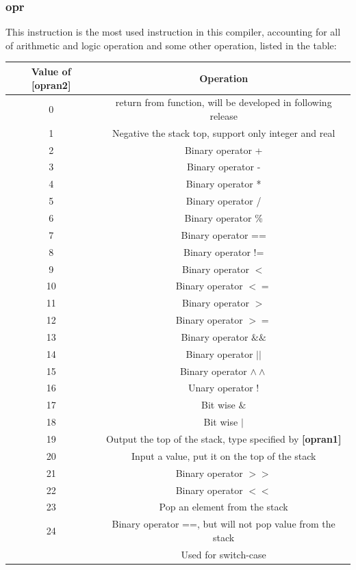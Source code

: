 \documentclass{article}
\begin{document}
		\subsubsection{opr}
		This instruction is the most used instruction in this compiler, accounting for all of arithmetic and logic operation and some other operation, listed in the table:\\
		\begin{center}
			\begin{tabular}{cc}
			\toprule
			Value of \textbf{[opran2]} & Operation \\
			\midrule
			0 & return from function, will be developed in following release\\
			1 & Negative the stack top, support only integer and real\\
			2 & Binary operator + \\
			3 & Binary operator - \\
			4 & Binary operator * \\
			5 & Binary operator / \\
			6 & Binary operator \% \\
			7 & Binary operator == \\
			8 & Binary operator != \\
			9 & Binary operator $ < $ \\
			10 & Binary operator $ <= $ \\
			11 & Binary operator $ > $ \\
			12 & Binary operator $ >= $ \\
			13 & Binary operator $ \&\& $ \\
			14 & Binary operator $ || $ \\
			15 & Binary operator $ \wedge\wedge $ \\
			16 & Unary operator ! \\
			17 & Bit wise $ \& $\\
			18 & Bit wise $ | $\\
			19 & Output the top of the stack, type specified by \textbf{[opran1]}\\
			20 & Input a value, put it on the top of the stack\\
			21 & Binary operator $ >> $ \\
			22 & Binary operator $ << $ \\
			23 & Pop an element from the stack\\
			24 & Binary operator ==, but will not pop value from the stack\\
			   & Used for switch-case\\
			\bottomrule
			\end{tabular}
			\end{center}
			\hypertarget{4.3.2}{}
\end{document}
